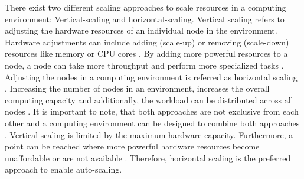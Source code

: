 There exist two different scaling approaches to scale resources in a computing environment: Vertical-scaling and horizontal-scaling.
Vertical scaling refers to adjusting the hardware resources of an individual node in the environment. Hardware adjustments can include adding (scale-up) or removing (scale-down) resources like memory or CPU cores \cite{Wilder2012CloudPatterns}. By adding more powerful resources to a node, a node can take more throughput and perform more specialized tasks \cite{Abbott2015ScalabilityArt}.
Adjusting the nodes in a computing environment is referred as horizontal scaling \cite{Wilder2012CloudPatterns}. Increasing the number of nodes in an environment, increases the overall computing capacity and additionally, the workload can be distributed across all nodes \cite{Wilder2012CloudPatterns, Abbott2015ScalabilityArt}.
It is important to note, that both approaches are not exclusive from each other and a computing environment can be designed to combine both approaches \cite{Wilder2012CloudPatterns}.
Vertical scaling is limited by the maximum hardware capacity. Furthermore, a point can be reached where more powerful hardware resources become unaffordable or are not available \cite{Abbot2011ScalabilityRules}.  Therefore, horizontal scaling is the preferred approach to enable auto-scaling.


